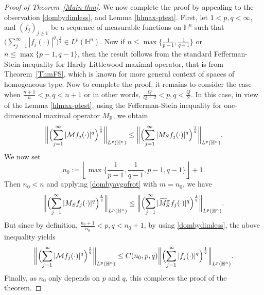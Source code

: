 \documentclass[11pt]{amsart}
\newcommand {\R}{\mathbb R}
\newcommand{\Ha}{\mathbb{H}^n}
\theoremstyle{definition}
\numberwithin{equation}{section}
\begin{document}
\begin{proof}[Proof of Theorem~\ref{Main-thm}]
We now complete the proof by appealing to the observation \eqref{dombydimless}, and Lemma \ref{hlmax-ptest}. First, let $1<p,q<\infty$, and $(f_j)_{j\geq1}$ be a sequence of measurable functions on $\Ha$ such that  $\bigl(\sum_{j=1}^{\infty}|f_j(\cdot)|^q\bigr)^\frac{1}{q} \in L^p(\Ha).$ 
Now if $n\leq \max\{\frac{1}{p-1}, \frac{1}{q-1}\}$ or $n\leq \max \{p-1, q-1\}$, then the result follows from the standard Fefferman-Stein inequality for Hardy-Littlewood maximal operator, that is from Theorem~\ref{ThmFS}, which is known for more general context of spaces of homogeneous type. 
Now to complete the proof, it remains to consider the case when  $\frac{n+1}{n}<p,q< n+1$ or in other words, $\frac{Q}{Q-2}<p,q<\frac{Q}2.$  In this case, in view of the Lemma \ref{hlmax-ptest},   using the Fefferman-Stein inequality for one-dimensional maximal operator $M_{\R}$, we obtain 
\begin{align*}
\biggl\|\Bigl(\sum_{j=1}^{\infty}|\mathcal{M}f_j(\cdot)|^q\Bigr)^\frac{1}{q}\biggr\|_{L^p(\Ha)}\leq \biggl\|\Bigl(\sum_{j=1}^{\infty}|M_Sf_j(\cdot)|^q\Bigr)^\frac{1}{q}\biggr\|_{L^p(\Ha)}.
\end{align*} 
We now set $$n_0:= \left\lfloor\max\bigg\{ \frac{1}{p-1}, \frac{1}{q-1}, p-1, q-1\bigg\}\right\rfloor+1.$$ Then $n_0<n$ and applying \eqref{dombyavgofrot} with $m=n_0$, we have
$$\biggl\|\Bigl(\sum_{j=1}^{\infty}|M_Sf_j(\cdot)|^q\Bigr)^\frac{1}{q}\biggr\|_{L^p(\Ha)}\leq \biggl\|\Bigl(\sum_{j=1}^{\infty}|\widetilde{M}^\sigma_Sf_j(\cdot)|^q\Bigr)^\frac{1}{q}\biggr\|_{L^p(\Ha)}.$$
But since by definition, $\frac{n_0+1}{n_0}<p,q<n_0+1$, by using \eqref{dombydimless}, the above inequality yields 
$$\biggl\|\Bigl(\sum_{j=1}^{\infty}|\mathcal{M}f_j(\cdot)|^q\Bigr)^\frac{1}{q}\biggr\|_{L^p(\Ha)}\leq C({n_0,p,q})\biggl\|\Bigl(\sum_{j=1}^{\infty}|f_j(\cdot)|^q\Bigr)^\frac{1}{q}\biggr\|_{L^p(\Ha)}.$$
Finally, as $n_0$ only depends on $p$ and $q$, this completes the proof of the theorem.
\end{proof}
\end{document}
